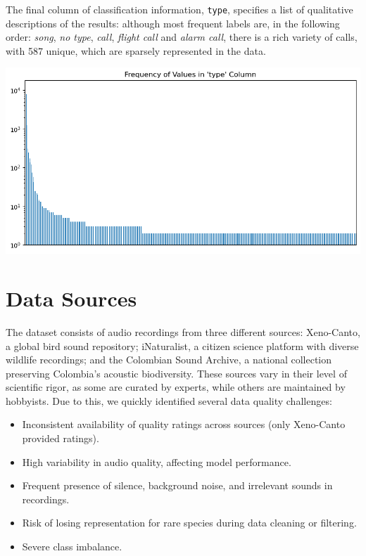 \documentclass[10pt]{article}
\begin{document}
\begin{minipage}{0.48\linewidth}
The final column of classification information, \texttt{type}, specifies a list of qualitative descriptions of the results: although most frequent labels are, in the following order: \textit{song}, \textit{no type}, \textit{call}, \textit{flight call} and \textit{alarm call}, there is a rich variety of calls, with 587 unique, which are sparsely represented in the data.
\end{minipage}
\hfill
\begin{minipage}{0.48\linewidth}
  \includegraphics[width=\linewidth]{img/train_type_histogram.png}
\end{minipage}

\section*{Data Sources}

The dataset consists of audio recordings from three different sources: Xeno-Canto, a global bird sound repository; iNaturalist, a citizen science platform with diverse wildlife recordings; and the Colombian Sound Archive, a national collection preserving Colombia's acoustic biodiversity. These sources vary in their level of scientific rigor, as some are curated by experts, while others are maintained by hobbyists. Due to this, we quickly identified several data quality challenges:

\begin{itemize}
  \item Inconsistent availability of quality ratings across sources (only Xeno-Canto provided ratings).
  \item High variability in audio quality, affecting model performance.
  \item Frequent presence of silence, background noise, and irrelevant sounds in recordings.
  \item Risk of losing representation for rare species during data cleaning or filtering.
  \item Severe class imbalance.
\end{itemize}
\end{document}
